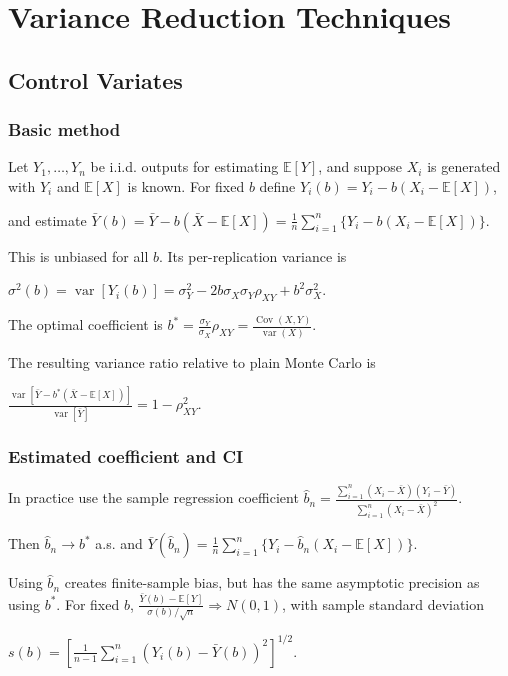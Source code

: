 \section{Variance Reduction Techniques}

\subsection{Control Variates}

\subsubsection*{Basic method}

Let $Y_1,\ldots,Y_n$ be i.i.d. outputs for estimating $\mathbb{E}[Y]$, and suppose $X_i$ is generated with $Y_i$ and $\mathbb{E}[X]$ is known. For fixed $b$ define
$Y_i(b)=Y_i-b(X_i-\mathbb{E}[X])$,

and estimate
$\bar{Y}(b)=\bar{Y}-b(\bar{X}-\mathbb{E}[X])=\frac{1}{n}\sum_{i=1}^n\{Y_i-b(X_i-\mathbb{E}[X])\}$.

This is unbiased for all $b$. Its per-replication variance is

$\sigma^2(b)=\operatorname{var}[Y_i(b)]=\sigma_Y^2-2b\sigma_X\sigma_Y\rho_{XY}+b^2\sigma_X^2$.

The optimal coefficient is
$b^*=\frac{\sigma_Y}{\sigma_X}\rho_{XY}=\frac{\operatorname{Cov}(X,Y)}{\operatorname{var}(X)}$.

The resulting variance ratio relative to plain Monte Carlo is

$\frac{\operatorname{var}[\bar{Y}-b^*(\bar{X}-\mathbb{E}[X])]}{\operatorname{var}[\bar{Y}]}=1-\rho_{XY}^2$.


\subsubsection*{Estimated coefficient and CI}

In practice use the sample regression coefficient
$\hat{b}_n=\frac{\sum_{i=1}^n(X_i-\bar{X})(Y_i-\bar{Y})}{\sum_{i=1}^n(X_i-\bar{X})^2}$.

Then $\hat{b}_n\to b^*$ a.s. and
$\bar{Y}(\hat{b}_n)=\frac{1}{n}\sum_{i=1}^n\{Y_i-\hat{b}_n(X_i-\mathbb{E}[X])\}$.

Using $\hat{b}_n$ creates finite-sample bias, but has the same asymptotic precision as using $b^*$. For fixed $b$,
$\frac{\bar{Y}(b)-\mathbb{E}[Y]}{\sigma(b)/\sqrt{n}}\Rightarrow N(0,1)$,
with sample standard deviation

$s(b)=\left[\frac{1}{n-1}\sum_{i=1}^n(Y_i(b)-\bar{Y}(b))^2\right]^{1/2}$.

